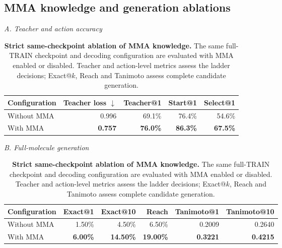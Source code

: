 \subsection{MMA knowledge and generation ablations}

\begin{table}[!htbp]
\centering
\caption{\textbf{Strict same-checkpoint ablation of MMA knowledge.}
The same full-TRAIN checkpoint and decoding configuration are evaluated with
MMA enabled or disabled. Teacher and action-level metrics assess the ladder
decisions; Exact@$k$, Reach and Tanimoto assess complete candidate generation.}
\label{tab:mma_strict_ablation}
\small
\setlength{\tabcolsep}{3.5pt}
\renewcommand{\arraystretch}{1.10}
\noindent\textit{A. Teacher and action accuracy}\par\vspace{3pt}
\begin{tabular}{@{}lrrrr@{}}
\toprule
Configuration & Teacher loss $\downarrow$ & Teacher@1 & Start@1 & Select@1 \\
\midrule
Without MMA & 0.996 & 69.1\% & 76.4\% & 54.6\% \\
With MMA & \textbf{0.757} & \textbf{76.0\%} & \textbf{86.3\%} & \textbf{67.5\%} \\
\bottomrule
\end{tabular}
\par\vspace{8pt}
\noindent\textit{B. Full-molecule generation}\par\vspace{3pt}
\begin{tabular}{@{}lrrrrr@{}}
\toprule
Configuration & Exact@1 & Exact@10 & Reach & Tanimoto@1 & Tanimoto@10 \\
\midrule
Without MMA & 1.50\% & 4.50\% & 6.50\% & 0.2009 & 0.2640 \\
With MMA & \textbf{6.00\%} & \textbf{14.50\%} & \textbf{19.00\%} & \textbf{0.3221} & \textbf{0.4215} \\
\bottomrule
\end{tabular}
\end{table}

